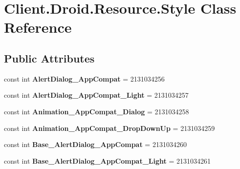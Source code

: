 \hypertarget{classClient_1_1Droid_1_1Resource_1_1Style}{}\section{Client.\+Droid.\+Resource.\+Style Class Reference}
\label{classClient_1_1Droid_1_1Resource_1_1Style}
\subsection*{Public Attributes}
\begin{DoxyCompactItemize}
\item 
\hypertarget{classClient_1_1Droid_1_1Resource_1_1Style_a16547a706f027bb700459cd19f96f851}{}const int {\bfseries Alert\+Dialog\+\_\+\+App\+Compat} = 2131034256\label{classClient_1_1Droid_1_1Resource_1_1Style_a16547a706f027bb700459cd19f96f851}

\item 
\hypertarget{classClient_1_1Droid_1_1Resource_1_1Style_a81dae92d187248fe3e8832ae0dab6414}{}const int {\bfseries Alert\+Dialog\+\_\+\+App\+Compat\+\_\+\+Light} = 2131034257\label{classClient_1_1Droid_1_1Resource_1_1Style_a81dae92d187248fe3e8832ae0dab6414}

\item 
\hypertarget{classClient_1_1Droid_1_1Resource_1_1Style_a25872ee251dfedeccfce94110164ad5c}{}const int {\bfseries Animation\+\_\+\+App\+Compat\+\_\+\+Dialog} = 2131034258\label{classClient_1_1Droid_1_1Resource_1_1Style_a25872ee251dfedeccfce94110164ad5c}

\item 
\hypertarget{classClient_1_1Droid_1_1Resource_1_1Style_a31d48397a9971758d7e3a10c72b594f4}{}const int {\bfseries Animation\+\_\+\+App\+Compat\+\_\+\+Drop\+Down\+Up} = 2131034259\label{classClient_1_1Droid_1_1Resource_1_1Style_a31d48397a9971758d7e3a10c72b594f4}

\item 
\hypertarget{classClient_1_1Droid_1_1Resource_1_1Style_a8c1c8550a81cb003080803be2e47b821}{}const int {\bfseries Base\+\_\+\+Alert\+Dialog\+\_\+\+App\+Compat} = 2131034260\label{classClient_1_1Droid_1_1Resource_1_1Style_a8c1c8550a81cb003080803be2e47b821}

\item 
\hypertarget{classClient_1_1Droid_1_1Resource_1_1Style_a53ff0e6703d34a0ae190f51646c12a7a}{}const int {\bfseries Base\+\_\+\+Alert\+Dialog\+\_\+\+App\+Compat\+\_\+\+Light} = 2131034261\label{classClient_1_1Droid_1_1Resource_1_1Style_a53ff0e6703d34a0ae190f51646c12a7a}


\end{DoxyCompactItemize}
